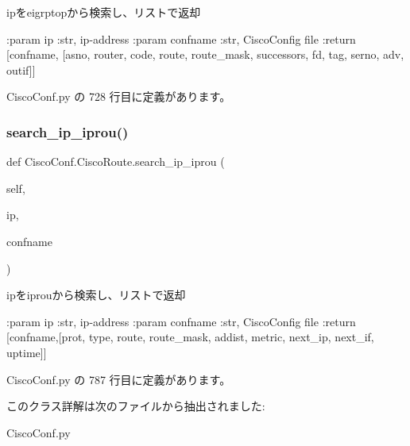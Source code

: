 \begin{DoxyVerb}ipをeigrptopから検索し、リストで返却

:param ip       :str, ip-address
:param confname :str, CiscoConfig file
:return [confname, [asno, router, code, route, route_mask, successors, fd, tag, serno, adv, outif]]
\end{DoxyVerb}
 

 Cisco\+Conf.\+py の 728 行目に定義があります。

\mbox{\label{classCiscoConf_1_1CiscoRoute_ae513b71a4e432a9d36315e9b5705c23c}} 
\subsubsection{\texorpdfstring{search\_ip\_iprou()}{search\_ip\_iprou()}}
{\footnotesize\ttfamily def Cisco\+Conf.\+Cisco\+Route.\+search\+\_\+ip\+\_\+iprou (\begin{DoxyParamCaption}\item[{}]{self,  }\item[{}]{ip,  }\item[{}]{confname }\end{DoxyParamCaption})}

\begin{DoxyVerb}ipをiprouから検索し、リストで返却

:param ip       :str, ip-address
:param confname :str, CiscoConfig file
:return [confname,[prot, type, route, route_mask, addist, metric, next_ip, next_if, uptime]]
\end{DoxyVerb}
 

 Cisco\+Conf.\+py の 787 行目に定義があります。



このクラス詳解は次のファイルから抽出されました\+:\begin{DoxyCompactItemize}
\item 
Cisco\+Conf.\+py\end{DoxyCompactItemize}
